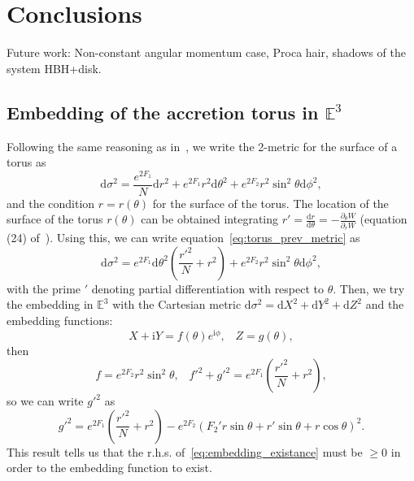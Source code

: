 \documentclass[twocolumn,aps,showpacs,showkeys,prd,superscriptaddress,byrevtex, amsmath]{revtex4-1}
\begin{document}
\section{Conclusions}
\label{conclusions}

Future work: Non-constant angular momentum case, Proca hair, shadows of the system HBH+disk.

\begin{acknowledgements}

\end{acknowledgements}




\begin{appendix}
\section{Embedding of the accretion torus in $\mathbb{E}^3$}\label{torus_embedding}
Following the same reasoning as in~\cite{Delgado:2018}, we write the 2-metric for the surface of a torus as 
\begin{equation}\label{eq:torus_prev_metric}
\mathrm{d}\sigma^2 = \frac{e^{2 F_1}}{N}\mathrm{d}r^2+ e^{2 F_1}r^2\mathrm{d}\theta^2+e^{2 F_2} r^2 \sin^2\theta \mathrm{d}\phi^2,
\end{equation}
and the condition $r = r(\theta)$ for the surface of the torus. The location of the surface of the torus $r(\theta)$ can be obtained integrating $r' = \frac{\mathrm{d}r}{\mathrm{d}\theta} = -\frac{\partial_{\theta}W}{\partial_{r}W}$ (equation (24) of~\citep{Gimeno-Soler:2017}). Using this, we can write equation~\eqref{eq:torus_prev_metric} as
\begin{equation}\label{eq:torus_metric}
\mathrm{d}\sigma^2 = e^{2 F_1} \mathrm{d}\theta^2\left(\frac{r'^2}{N} +r^2\right)+e^{2 F_2} r^2 \sin^2\theta \mathrm{d}\phi^2,
\end{equation}
with the prime $'$ denoting partial differentiation with respect to $\theta$. Then, we try the embedding in $\mathbb{E}^3$ with the Cartesian metric $\mathrm{d}\sigma^2 = \mathrm{d}X^2 + \mathrm{d}Y^2 + \mathrm{d}Z^2$ and the embedding functions:
\begin{equation}
X + \mathrm{i}Y = f(\theta)e^{\mathrm{i}\phi},  \;\;\; Z = g(\theta),
\end{equation}
then
\begin{equation}
f = e^{2 F_2} r^2 \sin^2\theta, \;\;\; f'^2 + g'^2 = e^{2 F_1}\left(\frac{r'^2}{N} +r^2\right),
\end{equation}
so we can write $g'^2$ as
\begin{equation}\label{eq:embedding_existance}
g'^2 = e^{2 F_1}\left(\frac{r'^2}{N} +r^2\right) - e^{2 F_2} (F_2'r \sin \theta + r' \sin \theta + r \cos \theta)^2.
\end{equation}
This result tells us that the r.h.s. of~\eqref{eq:embedding_existance} must be $\geq 0$ in order to the embedding function to exist.


\end{appendix}
\end{document}
